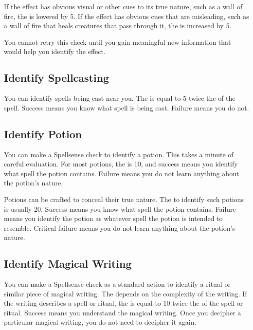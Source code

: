         If the effect has obvious visual or other cues to its true nature, such as a wall of fire, the  is lowered by 5.
        If the effect has obvious cues that are misleading, such as a wall of fire that heals creatures that pass through it, the  is increased by 5.

        You cannot retry this check until you gain meaningful new information that would help you identify the effect.

    \subsection{Identify Spellcasting}
        You can identify spells being cast near you.
        The  is equal to 5 \add twice the  of the spell.
        Success means you know what spell is being cast.
        Failure means you do not.

    \subsection{Identify Potion}
        You can make a  Spellsense check to identify a potion.
        This takes a minute of careful evaluation.
        For most potions, the  is 10, and success means you identify what spell the potion contains.
        Failure means you do not learn anything about the potion's nature.

        Potions can be crafted to conceal their true nature.
        The  to identify such potions is usually 20.
        Success means you know what spell the potion contains.
        Failure means you identify the potion as whatever spell the potion is intended to resemble.
        Critical failure means you do not learn anything about the potion's nature.

    \subsection{Identify Magical Writing}\label{Identify Magical Writing}
        You can make a Spellsense check as a standard action to identify a ritual or similar piece of magical writing.
        The  depends on the complexity of the writing.
        If the writing describes a spell or ritual, the  is equal to 10 \add twice the  of the spell or ritual.
        Success means you understand the magical writing.
        Once you decipher a particular magical writing, you do not need to decipher it again.

